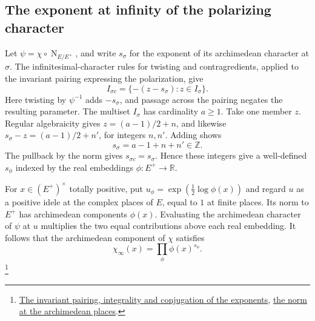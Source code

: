 \subsection{The exponent at infinity of the polarizing character}

Let \(\psi=\chi\circ\operatorname{N}_{E/E^+}\), and write \(s_\sigma\)
for the exponent of its archimedean character at \(\sigma\). The
infinitesimal-character rules for twisting and contragredients, applied
to the invariant pairing expressing the polarization, give
\begin{equation}\label{eq:galois-inf-char}
    I_{\sigma c}=\{-(z-s_\sigma):z\in I_\sigma\}.
\end{equation}
Here twisting by \(\psi^{-1}\) adds \(-s_\sigma\), and passage across
the pairing negates the resulting parameter. The multiset \(I_\sigma\)
has cardinality \(a\ge1\). Take one member \(z\). Regular algebraicity
gives \(z=(a-1)/2+n\), and likewise
\(s_\sigma-z=(a-1)/2+n'\), for integers \(n,n'\). Adding shows
\[
                  s_\sigma=a-1+n+n'\in\mathbb Z.
\]
The pullback by the norm gives \(s_{\sigma c}=s_\sigma\). Hence these
integers give a well-defined \(s_\phi\) indexed by the real embeddings
\(\phi:E^+\to\mathbb R\).

For \(x\in(E^+)^\times\) totally positive, put
\(u_\phi=\exp(\tfrac12\log\phi(x))\) and regard \(u\) as a positive
idele at the complex places of \(E\), equal to \(1\) at finite places.
Its norm to \(E^+\) has archimedean components \(\phi(x)\). Evaluating
the archimedean character of \(\psi\) at \(u\) multiplies the two
equal contributions above each real embedding. It follows that the
archimedean component of \(\chi\) satisfies
\begin{equation}\label{eq:galois-inf-weight}
              \chi_\infty(x)=\prod_\phi\phi(x)^{s_\phi}.
\end{equation}
\footnote{\href{https://github.com/Deicyde/riemann-hypothesis/blob/40e56bab/src/Development/AbelianVarietyTheory/Proofs/SatakeParameters/ExistsIsWeight.lean\#L25-L67}{The invariant pairing, integrality and conjugation of the exponents},
\href{https://github.com/Deicyde/riemann-hypothesis/blob/40e56bab/src/Development/AbelianVarietyTheory/Proofs/SatakeParameters/ExistsIsWeight.lean\#L67-L138}{the norm at the archimedean places}.}

